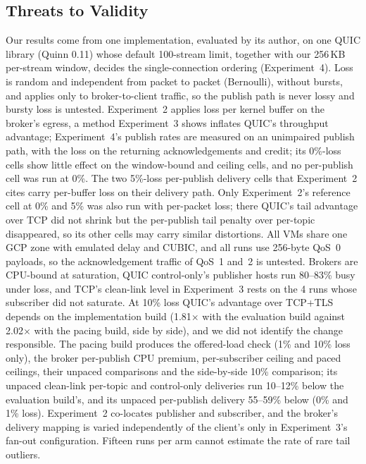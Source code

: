 \documentclass[a4paper,fleqn]{cas-dc}
\begin{document}
\subsection{Threats to Validity}
\label{sec:threats}

Our results come from one implementation, evaluated by its author, on one QUIC library (Quinn 0.11) whose default 100-stream limit, together with our 256\,KB per-stream window, decides the single-connection ordering (Experiment~4). Loss is random and independent from packet to packet (Bernoulli), without bursts, and applies only to broker-to-client traffic, so the publish path is never lossy and bursty loss is untested. Experiment~2 applies loss per kernel buffer on the broker's egress, a method Experiment~3 shows inflates QUIC's throughput advantage; Experiment~4's publish rates are measured on an unimpaired publish path, with the loss on the returning acknowledgements and credit; its 0\%-loss cells show little effect on the window-bound and ceiling cells, and no per-publish cell was run at 0\%. The two 5\%-loss per-publish delivery cells that Experiment~2 cites carry per-buffer loss on their delivery path. Only Experiment~2's reference cell at 0\% and 5\% was also run with per-packet loss; there QUIC's tail advantage over TCP did not shrink but the per-publish tail penalty over per-topic disappeared, so its other cells may carry similar distortions. All VMs share one GCP zone with emulated delay and CUBIC, and all runs use 256-byte QoS~0 payloads, so the acknowledgement traffic of QoS~1 and~2 is untested. Brokers are CPU-bound at saturation, QUIC control-only's publisher hosts run 80--83\% busy under loss, and TCP's clean-link level in Experiment~3 rests on the 4 runs whose subscriber did not saturate. At 10\% loss QUIC's advantage over TCP+TLS depends on the implementation build (1.81$\times$ with the evaluation build against 2.02$\times$ with the pacing build, side by side), and we did not identify the change responsible. The pacing build produces the offered-load check (1\% and 10\% loss only), the broker per-publish CPU premium, per-subscriber ceiling and paced ceilings, their unpaced comparisons and the side-by-side 10\% comparison; its unpaced clean-link per-topic and control-only deliveries run 10--12\% below the evaluation build's, and its unpaced per-publish delivery 55--59\% below (0\% and 1\% loss). Experiment~2 co-locates publisher and subscriber, and the broker's delivery mapping is varied independently of the client's only in Experiment~3's fan-out configuration. Fifteen runs per arm cannot estimate the rate of rare tail outliers.
\end{document}
